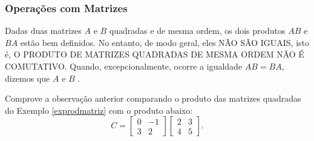 
\begin{frame}
	\frametitle{Operações com Matrizes} 


	\begin{observacao}
		Dadas duas matrizes $A$ e $B$ quadradas e de mesma ordem, os dois produtos $AB$ e $BA$ estão bem definidos. No entanto, de modo geral, eles NÃO SÃO IGUAIS, isto é, O PRODUTO DE MATRIZES QUADRADAS DE MESMA ORDEM NÃO É COMUTATIVO. Quando, excepcionalmente, ocorre a igualdade $AB = BA$, dizemos que $A$ e $B$ .
	\end{observacao}\pause

    \begin{exemplo}
        Comprove a observação anterior comparando o produto das matrizes quadradas do Exemplo \ref{exprodmatriz} com o produto abaixo: 
        \begin{displaymath} C = 
            \begin{bmatrix}
                0 & -1 \\
                3 & 2
            \end{bmatrix}  
            \begin{bmatrix}
                2 & 3 \\
                4 & 5 
            \end{bmatrix} .
        \end{displaymath}
    \end{exemplo}
\end{frame}

